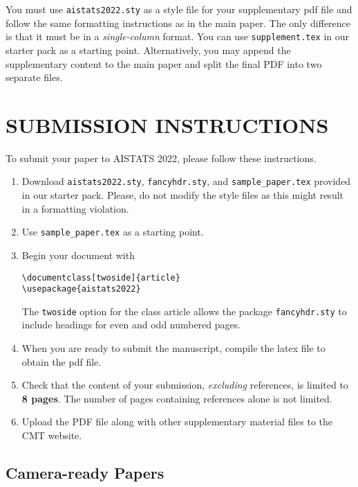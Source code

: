 \documentclass[twoside]{article}
\begin{document}
You must use \texttt{aistats2022.sty} as a style file for your supplementary pdf file and follow the same formatting instructions as in the main paper. 
The only difference is that it must be in a \emph{single-column} format.
You can use \texttt{supplement.tex} in our starter pack as a starting point.
Alternatively, you may append the supplementary content to the main paper and split the final PDF into two separate files.

\section{SUBMISSION INSTRUCTIONS}

To submit your paper to AISTATS 2022, please follow these instructions.

\begin{enumerate}
    \item Download \texttt{aistats2022.sty}, \texttt{fancyhdr.sty}, and \texttt{sample\_paper.tex} provided in our starter pack. 
    Please, do not modify the style files as this might result in a formatting violation.
    
    \item Use \texttt{sample\_paper.tex} as a starting point.
    \item Begin your document with
    \begin{flushleft}
    \texttt{\textbackslash documentclass[twoside]\{article\}}\\
    \texttt{\textbackslash usepackage\{aistats2022\}}
    \end{flushleft}
    The \texttt{twoside} option for the class article allows the
    package \texttt{fancyhdr.sty} to include headings for even and odd
    numbered pages.
    \item When you are ready to submit the manuscript, compile the latex file to obtain the pdf file.
    \item Check that the content of your submission, \emph{excluding} references, is limited to \textbf{8 pages}. The number of pages containing references alone is not limited.
    \item Upload the PDF file along with other supplementary material files to the CMT website.
\end{enumerate}

\subsection{Camera-ready Papers}
\end{document}
